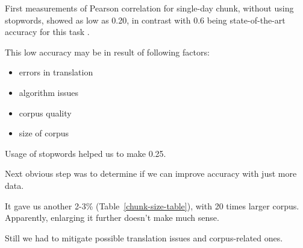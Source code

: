 \documentclass[11pt,letterpaper]{article}
\begin{document}
First measurements of Pearson correlation for single-day chunk, without using stopwords, 
showed as low as 0.20, in contrast with 0.6 being state-of-the-art accuracy 
for this task \cite{mikolov2013efficient}.  


This low accuracy may be in result of following factors:

\begin{itemize}
\item errors in translation 
\item algorithm issues
\item corpus quality
\item size of corpus
\end{itemize}

Usage of stopwords helped us to make 0.25. 

Next obvious step was to determine if we can improve accuracy with just more data.

It gave us another 2-3\% (Table~\ref{chunk-size-table}), with 20 times larger
corpus. Apparently, enlarging it further doesn't make much sense.

Still we had to mitigate possible translation issues and corpus-related ones.
\end{document}
